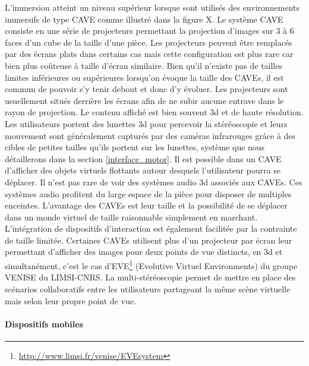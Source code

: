 L'immersion atteint un niveau supérieur lorsque sont utilisés des environnements immersifs de type CAVE \cite{cruz-neira_cave:_1992} comme illustré dans la figure X. Le système CAVE consiste en une série de projecteurs permettant la projection d'images sur 3 à 6 faces d'un cube de la taille d'une pièce. Les projecteurs peuvent être remplacés par des écrans plats dans certains cas mais cette configuration est plus rare car bien plus coûteuse à taille d'écran similaire. Bien qu'il n'existe pas de tailles limites inférieures ou supérieures lorsqu'on évoque la taille des CAVEs, il est commun de pouvoir s'y tenir debout et donc d'y évoluer. Les projecteurs sont usuellement situés derrière les écrans afin de ne subir aucune entrave dans le rayon de projection. Le contenu affiché est bien souvent 3d et de haute résolution. Les utilisateurs portent des lunettes 3d pour percevoir la stéréoscopie et leurs mouvement sont généralement capturés par des caméras infrarouges grâce à des cibles de petites tailles qu'ils portent sur les lunettes, système que nous détaillerons dans la section \ref{interface_motor}. Il est possible dans un CAVE d'afficher des objets virtuels flottants autour desquels l'utilisateur pourra se déplacer.
Il n'est pas rare de voir des systèmes audio 3d associés aux CAVEs. Ces systèmes audio profitent du large espace de la pièce pour disposer de multiples enceintes.
L'avantage des CAVEs est leur taille et la possibilité de se déplacer dans un monde virtuel de taille raisonnable simplement en marchant. L'intégration de dispositifs d'interaction est également facilitée par la contrainte de taille limitée. 
Certaines CAVEs utilisent plus d'un projecteur par écran leur permettant d'afficher des images pour deux points de vue distincts, en 3d et simultanément, c'est le cas d'EVE\footnote{\url{http://www.limsi.fr/venise/EVEsystem}} (Evolutive Virtuel Environments) du groupe VENISE du LIMSI-CNRS. La multi-stéréoscopie permet de mettre en place des scénarios collaboratifs entre les utilisateurs partageant la même scène virtuelle mais selon leur propre point de vue.

\paragraph{Dispositifs mobiles} \label{dispo_mobil}

